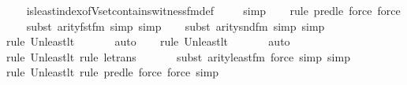 \begin{isabellebody}
\ \ \isamarkupfalse%
\ is{\isacharunderscore}{\kern0pt}least{\isacharunderscore}{\kern0pt}index{\isacharunderscore}{\kern0pt}of{\isacharunderscore}{\kern0pt}Vset{\isacharunderscore}{\kern0pt}contains{\isacharunderscore}{\kern0pt}witness{\isacharunderscore}{\kern0pt}fm{\isacharunderscore}{\kern0pt}def\isanewline
\ \ \ \isamarkupfalse%
\ simp\isanewline
\ \ \ \isamarkupfalse%
{\isacharparenleft}{\kern0pt}rule\ pred{\isacharunderscore}{\kern0pt}le{\isacharcomma}{\kern0pt}\ force{\isacharcomma}{\kern0pt}\ force{\isacharparenright}{\kern0pt}{\isacharplus}{\kern0pt}\isanewline
\ \ \ \isamarkupfalse%
{\isacharparenleft}{\kern0pt}subst\ arity{\isacharunderscore}{\kern0pt}fst{\isacharunderscore}{\kern0pt}fm{\isacharcomma}{\kern0pt}\ simp{\isacharcomma}{\kern0pt}\ simp{\isacharparenright}{\kern0pt}\isanewline
\ \ \ \isamarkupfalse%
{\isacharparenleft}{\kern0pt}subst\ arity{\isacharunderscore}{\kern0pt}snd{\isacharunderscore}{\kern0pt}fm{\isacharcomma}{\kern0pt}\ simp{\isacharcomma}{\kern0pt}\ simp{\isacharparenright}{\kern0pt}\isanewline
\ \ \ \isamarkupfalse%
{\isacharparenleft}{\kern0pt}rule\ Un{\isacharunderscore}{\kern0pt}least{\isacharunderscore}{\kern0pt}lt{\isacharparenright}{\kern0pt}{\isacharplus}{\kern0pt}\isanewline
\ \ \ \ \ \isamarkupfalse%
\ auto{\isacharbrackleft}{\kern0pt}{}{\isacharbrackright}{\kern0pt}\isanewline
\ \ \ \isamarkupfalse%
{\isacharparenleft}{\kern0pt}rule\ Un{\isacharunderscore}{\kern0pt}least{\isacharunderscore}{\kern0pt}lt{\isacharparenright}{\kern0pt}{\isacharplus}{\kern0pt}\isanewline
\ \ \ \ \ \isamarkupfalse%
\ auto{\isacharbrackleft}{\kern0pt}{}{\isacharbrackright}{\kern0pt}\isanewline
\ \ \ \isamarkupfalse%
{\isacharparenleft}{\kern0pt}rule\ Un{\isacharunderscore}{\kern0pt}least{\isacharunderscore}{\kern0pt}lt{\isacharcomma}{\kern0pt}\ rule\ le{\isacharunderscore}{\kern0pt}trans{\isacharparenright}{\kern0pt}\ \isanewline
\ \ \ \ \ \isamarkupfalse%
{\isacharparenleft}{\kern0pt}subst\ arity{\isacharunderscore}{\kern0pt}least{\isacharunderscore}{\kern0pt}fm{\isacharcomma}{\kern0pt}\ force{\isacharcomma}{\kern0pt}\ simp{\isacharcomma}{\kern0pt}\ simp{\isacharparenright}{\kern0pt}\isanewline
\ \ \ \ \isamarkupfalse%
{\isacharparenleft}{\kern0pt}rule\ Un{\isacharunderscore}{\kern0pt}least{\isacharunderscore}{\kern0pt}lt{\isacharcomma}{\kern0pt}\ rule\ pred{\isacharunderscore}{\kern0pt}le{\isacharcomma}{\kern0pt}\ force{\isacharcomma}{\kern0pt}\ force{\isacharcomma}{\kern0pt}\ simp{\isacharparenright}{\kern0pt}\isanewline

\end{isabellebody}
